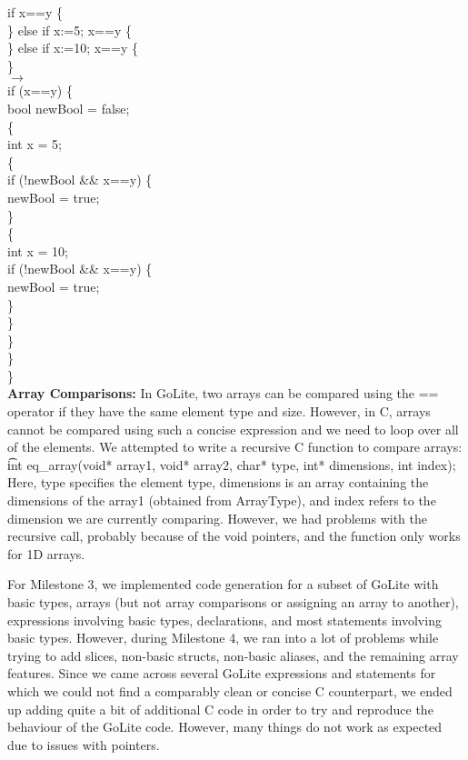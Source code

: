 \documentclass[11pt]{article}
\begin{document}
\t{
	if x==y \{ \\
	\} else if x:=5; x==y \{ \\
	\} else if x:=10; x==y \{ \\
	\}
}\\
	$\longrightarrow$ \\
\t{
	if (x==y) \{ \\
	bool newBool = false; \\
	\{\\
	\indent int x = 5; \\
	\indent \{ \\
	\indent \indent if (!newBool \&\& x==y) \{ \\
		\indent \indent \indent newBool = true; \\
	\indent\indent \} \\
	\indent \indent \{ \\
	\indent \indent \indent int x = 10; \\
	\indent \indent \indent if (!newBool \&\& x==y) \{ \\
		\indent \indent \indent \indent newBool = true; \\
	\indent\indent\indent\} \\
	\indent\indent\} \\
	\indent\} \\
	\} \\
	\}
}
\\[12pt]
{\bf Array Comparisons: }In GoLite, two arrays can be compared using the == operator if they have the same element type and size. However, in C, arrays cannot be compared using such a concise expression and we need to loop over all of the elements. We attempted to write a recursive C function to compare arrays: \\
\t{int eq\_array(void* array1, void* array2, char* type, int* dimensions, int index)};\\
Here, type specifies the element type, dimensions is an array containing the dimensions of the array1 (obtained from ArrayType), and index refers to the dimension we are currently comparing. However, we had problems with the recursive call, probably because of the void pointers, and the function only works for 1D arrays.

For Milestone 3, we implemented code generation for a subset of GoLite with basic types, arrays (but not array comparisons or assigning an array to another), expressions involving basic types, declarations, and most statements involving basic types. However, during Milestone 4, we ran into a lot of problems while trying to add slices, non-basic structs, non-basic aliases, and the remaining array features. Since we came across several GoLite expressions and statements for which we could not find a comparably clean or concise C counterpart, we ended up adding quite a bit of additional C code in order to try and reproduce the behaviour of the GoLite code. However, many things do not work as expected due to issues with pointers.
\end{document}
